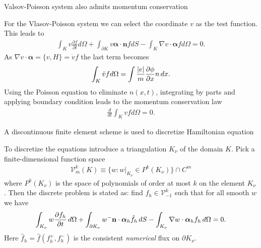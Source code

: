 \documentclass[pdf]{beamer}
\newcommand{\pfrac}[2]{\frac{\partial #1}{\partial #2}}
\newcommand{\mvec}[1]{\mathbf{#1}}
\newcommand{\gvec}[1]{\boldsymbol{#1}}
\theoremstyle{definition}
\begin{document}
\begin{frame}{Valsov-Poisson system also admits momentum
    conservation}%
  
  For the Vlasov-Poisson system we can select the coordinate $v$ as
  the test function. This leads to
  \begin{align*}
    \int_K v\pfrac{f}{t}d\Omega 
    + \int_{\partial K}v \gvec{\alpha}\cdot\mvec{n}f dS
    - \int_K \nabla v \cdot \gvec{\alpha} f d\Omega
    = 0.
  \end{align*}
  As $\nabla v \cdot \gvec{\alpha} = \{v,H\} = \dot{v}f$ the last term
  becomes
  \begin{align*}
    \int_K\dot{v} f d\Omega = \int \frac{|e|}{m} \pfrac{\phi}{x} n\thinspace dx.
  \end{align*}
  Using the Poisson equation to eliminate $n(x,t)$, integrating by
  parts and applying boundary condition leads to the momentum
  conservation law
  \begin{align*}
    \frac{d}{dt}\int_K vf d\Omega = 0.
  \end{align*} 
\end{frame}

\begin{frame}{A discontinuous finite element scheme is used to
    discretize Hamiltonian equation}

  To discretize the equations introduce a triangulation $K_\nu$ of the
  domain $K$. Pick a finite-dimensional function space
  \begin{align*}
    \mathcal{V}^k_m(K) \equiv \{w: w|_{K_\nu} \in P^k(K_\nu) \} \cap C^m
  \end{align*}
  where $P^k(K_\nu)$ is the space of polynomials of order at most $k$
  on the element $K_\nu$. Then the discrete problem is stated as: find
  $f_h\in \mathcal{V}^k_{-1}$ such that for all smooth $w$ we have
  \begin{align*}
    \int_{K_\nu} w \pfrac{f_h}{t}\thinspace d\Omega 
    +
    \int_{\partial K_\nu}w^- \mvec{n}\cdot\gvec{\alpha}_h\hat{f}_h\thinspace dS
    -
    \int_{K_\nu} \nabla w\cdot\gvec{\alpha}_h f_h\thinspace d\Omega = 0.
  \end{align*}
  Here $\hat{f}_h = \hat{f}(f^+_h,f^-_h)$ is the consistent
  \emph{numerical} flux on $\partial K_\nu$.
\end{frame}
\end{document}
